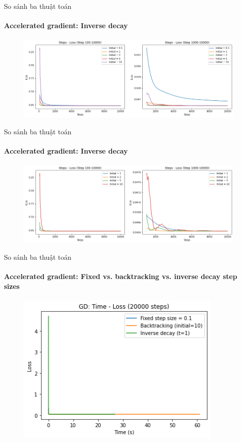 \documentclass[10pt]{beamer}
\theoremstyle{remark}
\theoremstyle{definition}
\begin{document}
\begin{frame}{So sánh ba thuật toán}
	\framesubtitle{Accelerated gradient: Inverse decay}

	\begin{figure}[h!]
		\centering
		\includegraphics[width=12cm]{Thinh/21.png}
	\end{figure}

\end{frame}

\begin{frame}{So sánh ba thuật toán}
	\framesubtitle{Accelerated gradient: Inverse decay}

	\begin{figure}[h!]
		\centering
		\includegraphics[width=12cm]{Thinh/22.png}
	\end{figure}
\end{frame}

\begin{frame}{So sánh ba thuật toán}
	\framesubtitle{Accelerated gradient: Fixed vs. backtracking vs. inverse decay step sizes }
	\begin{figure}[h!]
		\centering
		\includegraphics[width=10cm]{Thinh/23.png}
	\end{figure}
\end{frame}
\end{document}
